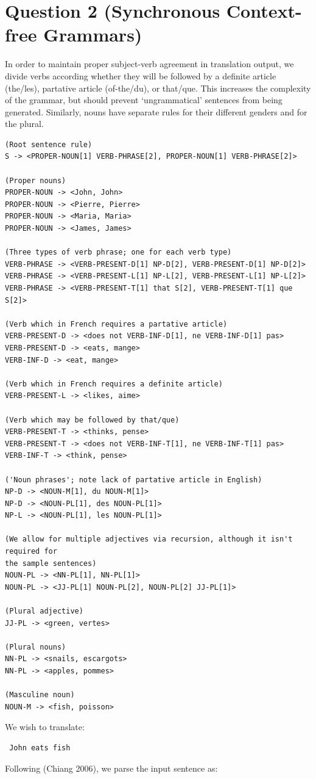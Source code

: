 \documentclass[11pt]{article}
\begin{document}
\section*{Question 2 (Synchronous Context-free Grammars)}

In order to maintain proper subject-verb agreement in translation output, we
divide verbs according whether they will be followed by a definite article
(the/les), partative article (of-the/du), or that/que. This increases the
complexity of the grammar, but should prevent `ungrammatical' sentences from
being generated.
Similarly, nouns have separate rules for their different genders and for the plural.

\small
\begin{verbatim}
(Root sentence rule)
S -> <PROPER-NOUN[1] VERB-PHRASE[2], PROPER-NOUN[1] VERB-PHRASE[2]>

(Proper nouns)
PROPER-NOUN -> <John, John>
PROPER-NOUN -> <Pierre, Pierre>
PROPER-NOUN -> <Maria, Maria>
PROPER-NOUN -> <James, James>

(Three types of verb phrase; one for each verb type)
VERB-PHRASE -> <VERB-PRESENT-D[1] NP-D[2], VERB-PRESENT-D[1] NP-D[2]>
VERB-PHRASE -> <VERB-PRESENT-L[1] NP-L[2], VERB-PRESENT-L[1] NP-L[2]>
VERB-PHRASE -> <VERB-PRESENT-T[1] that S[2], VERB-PRESENT-T[1] que S[2]>

(Verb which in French requires a partative article)
VERB-PRESENT-D -> <does not VERB-INF-D[1], ne VERB-INF-D[1] pas>
VERB-PRESENT-D -> <eats, mange>
VERB-INF-D -> <eat, mange>

(Verb which in French requires a definite article)
VERB-PRESENT-L -> <likes, aime>

(Verb which may be followed by that/que)
VERB-PRESENT-T -> <thinks, pense>
VERB-PRESENT-T -> <does not VERB-INF-T[1], ne VERB-INF-T[1] pas>
VERB-INF-T -> <think, pense>

('Noun phrases'; note lack of partative article in English)
NP-D -> <NOUN-M[1], du NOUN-M[1]>
NP-D -> <NOUN-PL[1], des NOUN-PL[1]>
NP-L -> <NOUN-PL[1], les NOUN-PL[1]>

(We allow for multiple adjectives via recursion, although it isn't required for
the sample sentences)
NOUN-PL -> <NN-PL[1], NN-PL[1]>
NOUN-PL -> <JJ-PL[1] NOUN-PL[2], NOUN-PL[2] JJ-PL[1]>

(Plural adjective)
JJ-PL -> <green, vertes>

(Plural nouns)
NN-PL -> <snails, escargots>
NN-PL -> <apples, pommes>

(Masculine noun)
NOUN-M -> <fish, poisson>

\end{verbatim}
\normalsize
We wish to translate:
\begin{verbatim} John eats fish \end{verbatim}
Following (Chiang 2006)\cite{Chiang2006}, we parse the input sentence as:
\end{document}
